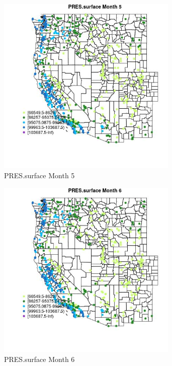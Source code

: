 \begin{figure} 
\centering  
\includegraphics[width=0.77\textwidth]{Code_Outputs/Report_ML_input_PM25_Step4_part_e_de_duplicated_aves_compiled_2019-05-14wNAs_MapObsMo5PRESsurface.jpg} 
\caption{\label{fig:Report_ML_input_PM25_Step4_part_e_de_duplicated_aves_compiled_2019-05-14wNAsMapObsMo5PRESsurface}PRES.surface Month 5} 
\end{figure} 
 

\begin{figure} 
\centering  
\includegraphics[width=0.77\textwidth]{Code_Outputs/Report_ML_input_PM25_Step4_part_e_de_duplicated_aves_compiled_2019-05-14wNAs_MapObsMo6PRESsurface.jpg} 
\caption{\label{fig:Report_ML_input_PM25_Step4_part_e_de_duplicated_aves_compiled_2019-05-14wNAsMapObsMo6PRESsurface}PRES.surface Month 6} 
\end{figure} 
 


